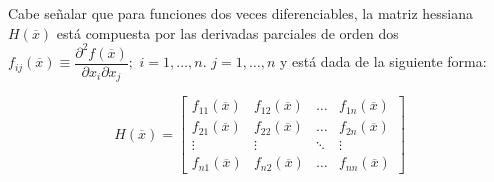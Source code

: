 Cabe se\~nalar que para funciones dos veces diferenciables, la matriz hessiana $H(\overline{x})$ est\'a compuesta por las derivadas parciales
de orden dos $f_{ij}(\overline{x}) \equiv \dfrac{\partial^2 f(\overline{x})}{\partial x_i \partial x_j};\,\, i = 1, \ldots , n.
\,\, j=1,\ldots , n$ y est\'a dada de la siguiente forma:

\[H(\overline{x}) = \begin{bmatrix}
                       f_{11}(\overline{x}) & f_{12}(\overline{x}) & \ldots & f_{1n}(\overline{x})\\
                       f_{21}(\overline{x}) & f_{22}(\overline{x}) & \ldots & f_{2n}(\overline{x})\\
                       \vdots               &  \vdots 		   & \ddots &  \vdots \\
                       f_{n1}(\overline{x}) & f_{n2}(\overline{x}) & \ldots & f_{nn}(\overline{x})
                    \end{bmatrix}
\]


~ \medskip


